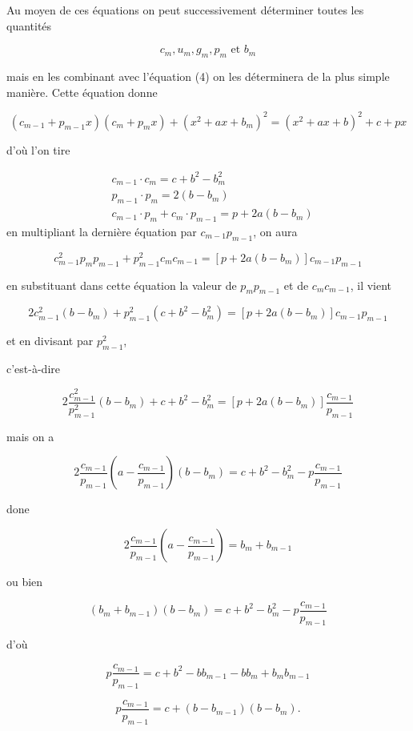 \documentclass{article}
\begin{document}
Au moyen de ces équations on peut successivement déterminer toutes les quantités

\[
c_{m}, u_{m}, g_{m}, p_{m} \text { et } b_{m}
\]

mais en les combinant avec l'équation (4) on les déterminera de la plus simple manière. Cette équation donne

\[
\left(c_{m-1}+p_{m-1} x\right)\left(c_{m}+p_{m} x\right)+\left(x^{2}+a x+b_{m}\right)^{2}=\left(x^{2}+a x+b\right)^{2}+c+p x
\]

d'où l'on tire

\[
\begin{aligned}
& c_{m-1} \cdot c_{m}=c+b^{2}-b_{m}^{2} \\
& p_{m-1} \cdot p_{m}=2\left(b-b_{m}\right) \\
& c_{m-1} \cdot p_{m}+c_{m} \cdot p_{m-1}=p+2 a\left(b-b_{m}\right)
\end{aligned}
\]
en multipliant la dernière équation par \(c_{m-1} p_{m-1}\), on aura

\[
c_{m-1}^{2} p_{m} p_{m-1}+p_{m-1}^{2} c_{m} c_{m-1}=\left[p+2 a\left(b-b_{m}\right)\right] c_{m-1} p_{m-1}
\]

en substituant dans cette équation la valeur de \(p_{m} p_{m-1}\) et de \(c_{m} c_{m-1}\), il vient

\[
2 c_{m-1}^{2}\left(b-b_{m}\right)+p_{m-1}^{2}\left(c+b^{2}-b_{m}^{2}\right)=\left[p+2 a\left(b-b_{m}\right)\right] c_{m-1} p_{m-1}
\]

et en divisant par \(p_{m-1}^{2}\),

c'est-à-dire

\[
2 \frac{c_{m-1}^{2}}{p_{m-1}^{2}}\left(b-b_{m}\right)+c+b^{2}-b_{m}^{2}=\left[p+2 a\left(b-b_{m}\right)\right] \frac{c_{m-1}}{p_{m-1}}
\]

mais on a

\[
2 \frac{c_{m-1}}{p_{m-1}}\left(a-\frac{c_{m-1}}{p_{m-1}}\right)\left(b-b_{m}\right)=c+b^{2}-b_{m}^{2}-p \frac{c_{m-1}}{p_{m-1}}
\]

done

\[
2 \frac{c_{m-1}}{p_{m-1}}\left(a-\frac{c_{m-1}}{p_{m-1}}\right)=b_{m}+b_{m-1}
\]

ou bien

\[
\left(b_{m}+b_{m-1}\right)\left(b-b_{m}\right)=c+b^{2}-b_{m}^{2}-p \frac{c_{m-1}}{p_{m-1}}
\]

d'où

\[
p \frac{c_{m-1}}{p_{m-1}}=c+b^{2}-b b_{m-1}-b b_{m}+b_{m} b_{m-1}
\]

\[
p \frac{c_{m-1}}{p_{m-1}}=c+\left(b-b_{m-1}\right)\left(b-b_{m}\right) .
\]
\end{document}
